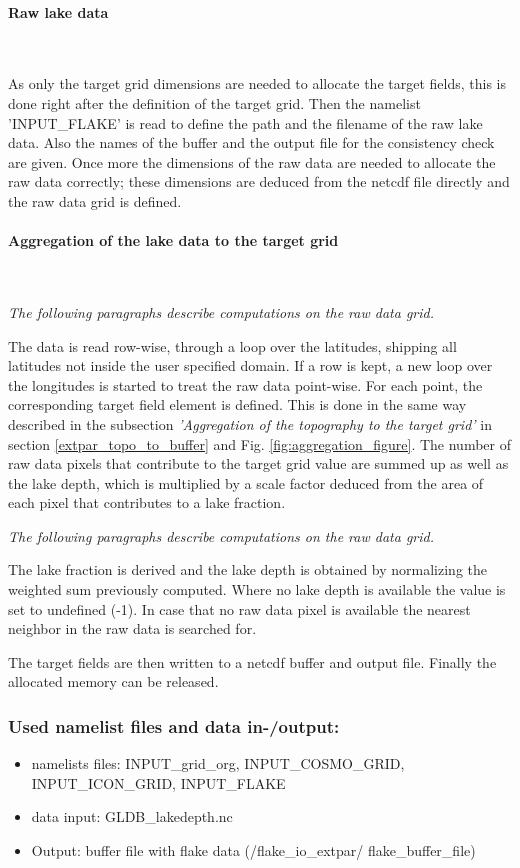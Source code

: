 \documentclass[a4paper,10pt,DIV14,BCOR1cm,titlepage,twoside]{scrartcl}
\begin{document}
\paragraph{Raw lake data}\ \par\medskip\noindent
As only the target grid dimensions are needed to allocate the target fields, this is done right after the definition of the target grid. Then the namelist 'INPUT\_FLAKE' is read to define the path and the filename of the raw lake data. Also the names of the buffer and the output file for the consistency check are given. Once more the dimensions of the raw data are needed to allocate the raw data correctly; these dimensions are deduced from the netcdf file directly and the raw data grid is defined.
\paragraph{Aggregation of the lake data to the target grid}\ \par\medskip\noindent
\textit{The following paragraphs describe computations on the raw data grid.} \par\medskip\noindent
The data is read row-wise, through a loop  over the latitudes, shipping all latitudes not inside the user specified domain. If a row is kept, a new loop over the longitudes is started to treat the raw data point-wise. For each point, the corresponding target field element is defined. This is done in the same way described in the subsection \textit{'Aggregation of the topography to the target grid'} in section \ref{extpar_topo_to_buffer} and Fig. \ref{fig:aggregation_figure}. The number of raw data pixels that contribute to the target grid value are summed up as well as the lake depth, which is multiplied by a scale factor deduced from the area of each pixel that contributes to a lake fraction. \par\medskip\noindent
\textit{The following paragraphs describe computations on the raw data grid.} \par\medskip\noindent
The lake fraction is derived and the lake depth is obtained by normalizing the weighted sum previously computed. Where no lake depth is available the value is set to undefined (-1). In case that no raw data pixel is available the nearest neighbor in the raw data is searched for. \par\medskip\noindent
The target fields are then written to a netcdf buffer and output file. Finally the allocated memory can be released.
\subsubsection{Used namelist files and data in-/output:}
\begin{itemize}
 \item namelists files: INPUT\_grid\_org, INPUT\_COSMO\_GRID, INPUT\_ICON\_GRID, INPUT\_FLAKE
 \item data input: GLDB\_lakedepth.nc
 \item Output: buffer file with flake data (/flake\_io\_extpar/ flake\_buffer\_file)
\end{itemize}
\end{document}
